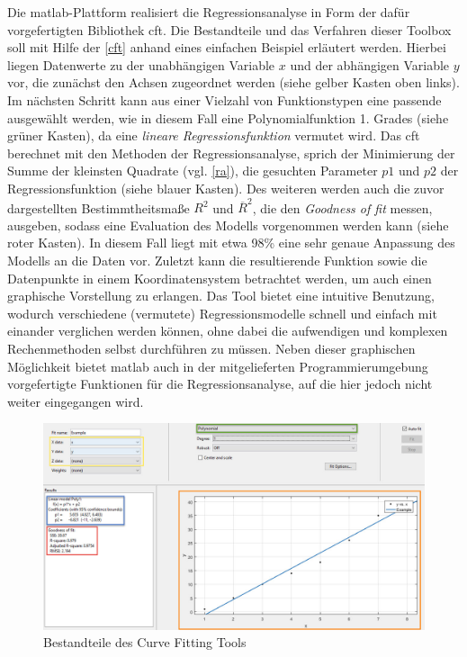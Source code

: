 Die \gls{matlab}-Plattform realisiert die Regressionsanalyse in Form der dafür vorgefertigten Bibliothek \gls{cft}. Die Bestandteile und das Verfahren dieser Toolbox soll mit Hilfe der \vref{cft} anhand eines einfachen Beispiel erläutert werden. Hierbei liegen Datenwerte zu der unabhängigen Variable $x$ und der abhängigen Variable $y$ vor, die zunächst den Achsen zugeordnet werden (siehe gelber Kasten oben links). Im nächsten Schritt kann aus einer Vielzahl von Funktionstypen eine passende ausgewählt werden, wie in diesem Fall eine Polynomialfunktion 1. Grades (siehe grüner Kasten), da eine \textit{lineare Regressionsfunktion} vermutet wird. Das \gls{cft} berechnet mit den Methoden der Regressionsanalyse, sprich der Minimierung der Summe der kleinsten Quadrate (vgl. \vref{ra}), die gesuchten Parameter $p1$ und $p2$ der Regressionsfunktion (siehe blauer Kasten). Des weiteren werden auch die zuvor dargestellten Bestimmtheitsmaße $R^2$ und $\overline{R}^2$, die den \textit{Goodness of fit} messen, ausgeben, sodass eine Evaluation des Modells vorgenommen werden kann (siehe roter Kasten). In diesem Fall liegt mit etwa 98\% eine sehr genaue Anpassung des Modells an die Daten vor. Zuletzt kann die resultierende Funktion sowie die Datenpunkte in einem Koordinatensystem betrachtet werden, um auch einen graphische Vorstellung zu erlangen. Das Tool bietet eine intuitive Benutzung, wodurch verschiedene (vermutete) Regressionsmodelle schnell und einfach mit einander verglichen werden können, ohne dabei die aufwendigen und komplexen Rechenmethoden selbst durchführen zu müssen. Neben dieser graphischen Möglichkeit bietet \gls{matlab} auch in der mitgelieferten Programmierumgebung vorgefertigte Funktionen für die Regressionsanalyse, auf die hier jedoch nicht weiter eingegangen wird.

\begin{figure}
\centering
\includegraphics[scale=0.675]{se-wa-jpg/cft}
\caption[Bestandteile des Curve Fitting Tools]{Bestandteile des Curve Fitting Tools\protect\footnotemark}
\label{cft}
\end{figure}
